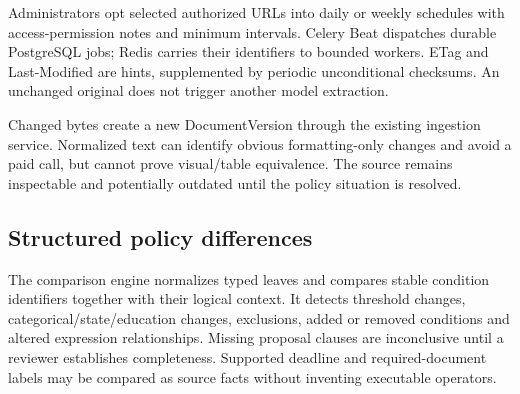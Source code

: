 \documentclass[12pt,a4paper,twoside]{report}
\begin{document}
Administrators opt selected authorized URLs into daily or weekly schedules with access-permission notes and minimum intervals. Celery Beat dispatches durable PostgreSQL jobs; Redis carries their identifiers to bounded workers. ETag and Last-Modified are hints, supplemented by periodic unconditional checksums. An unchanged original does not trigger another model extraction.

Changed bytes create a new DocumentVersion through the existing ingestion service. Normalized text can identify obvious formatting-only changes and avoid a paid call, but cannot prove visual/table equivalence. The source remains inspectable and potentially outdated until the policy situation is resolved.

\subsection*{Structured policy differences}

The comparison engine normalizes typed leaves and compares stable condition identifiers together with their logical context. It detects threshold changes, categorical/state/education changes, exclusions, added or removed conditions and altered expression relationships. Missing proposal clauses are inconclusive until a reviewer establishes completeness. Supported deadline and required-document labels may be compared as source facts without inventing executable operators.
\end{document}
